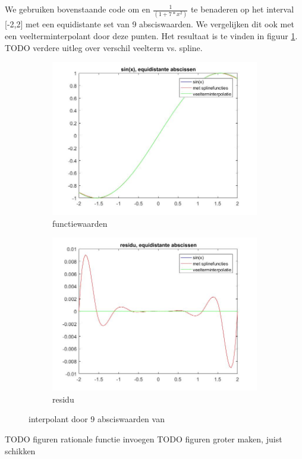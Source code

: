 We gebruiken bovenstaande code om  en $\frac{1}{(1+7*x^2)}$ te benaderen op het interval [-2,2] met een equidistante set van 9 absciswaarden. We vergelijken dit ook met een veelterminterpolant door deze punten. Het resultaat is te vinden in figuur \ref{fig:sinequi}. TODO verdere uitleg over verschil veelterm vs. spline.

\begin{figure}
\centering
\begin{subfigure}{.5\textwidth}
  \centering
  \includegraphics[width=.4\linewidth]{afbeeldingen/sin_equi.jpg}
  \caption{functiewaarden}
\end{subfigure}%
\begin{subfigure}{.5\textwidth}
  \centering
  \includegraphics[width=.4\linewidth]{afbeeldingen/sin_equi_res.jpg}
  \caption{residu}
\end{subfigure}
\caption{interpolant door 9 absciswaarden van }
\label{fig:sinequi}
\end{figure}

TODO figuren rationale functie invoegen
TODO figuren groter maken, juist schikken
